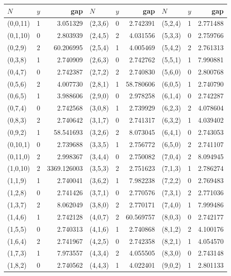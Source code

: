\documentclass[11pt]{article}
\theoremstyle{definition}
\begin{document}
\begin{center}\footnotesize
\begin{tabular}{lcr@{\qquad}lcr@{\qquad}lcr}
\toprule
$N$ & $y$ & gap & $N$ & $y$ & gap & $N$ & $y$ & gap\\
\midrule
(0,0,11) & 1 & 3.051329 & (2,3,6) & 0 & 2.742391 & (5,2,4) & 1 & 2.771488 \\
(0,1,10) & 0 & 2.803939 & (2,4,5) & 2 & 4.031556 & (5,3,3) & 0 & 2.759766 \\
(0,2,9) & 2 & 60.206995 & (2,5,4) & 1 & 4.005469 & (5,4,2) & 2 & 2.761313 \\
(0,3,8) & 1 & 2.740909 & (2,6,3) & 0 & 2.742762 & (5,5,1) & 1 & 7.990881 \\
(0,4,7) & 0 & 2.742387 & (2,7,2) & 2 & 2.740830 & (5,6,0) & 0 & 2.800768 \\
(0,5,6) & 2 & 4.007730 & (2,8,1) & 1 & 58.780606 & (6,0,5) & 1 & 2.740790 \\
(0,6,5) & 1 & 3.988606 & (2,9,0) & 0 & 2.978258 & (6,1,4) & 0 & 2.742287 \\
(0,7,4) & 0 & 2.742568 & (3,0,8) & 1 & 2.739929 & (6,2,3) & 2 & 4.078604 \\
(0,8,3) & 2 & 2.740642 & (3,1,7) & 0 & 2.741317 & (6,3,2) & 1 & 4.039402 \\
(0,9,2) & 1 & 58.541693 & (3,2,6) & 2 & 8.073045 & (6,4,1) & 0 & 2.743053 \\
(0,10,1) & 0 & 2.739688 & (3,3,5) & 1 & 2.756772 & (6,5,0) & 2 & 2.741107 \\
(0,11,0) & 2 & 2.998367 & (3,4,4) & 0 & 2.750082 & (7,0,4) & 2 & 8.094945 \\
(1,0,10) & 2 & 3369.126003 & (3,5,3) & 2 & 2.751623 & (7,1,3) & 1 & 2.786274 \\
(1,1,9) & 1 & 2.740041 & (3,6,2) & 1 & 7.982238 & (7,2,2) & 0 & 2.769483 \\
(1,2,8) & 0 & 2.741426 & (3,7,1) & 0 & 2.770576 & (7,3,1) & 2 & 2.771036 \\
(1,3,7) & 2 & 8.062049 & (3,8,0) & 2 & 2.770171 & (7,4,0) & 1 & 7.999486 \\
(1,4,6) & 1 & 2.742128 & (4,0,7) & 2 & 60.569757 & (8,0,3) & 0 & 2.742177 \\
(1,5,5) & 0 & 2.740313 & (4,1,6) & 1 & 2.740868 & (8,1,2) & 2 & 4.100176 \\
(1,6,4) & 2 & 2.741967 & (4,2,5) & 0 & 2.742358 & (8,2,1) & 1 & 4.054570 \\
(1,7,3) & 1 & 7.973557 & (4,3,4) & 2 & 4.055505 & (8,3,0) & 0 & 2.743148 \\
(1,8,2) & 0 & 2.740562 & (4,4,3) & 1 & 4.022401 & (9,0,2) & 1 & 2.801133 \\

\end{tabular}
\end{center}
\end{document}
